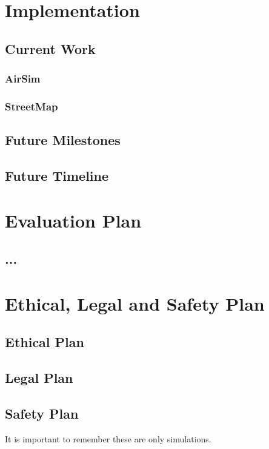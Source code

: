 \documentclass[11pt]{article}
\begin{document}
\section{Implementation}
\subsection{Current Work}
\subsubsection{AirSim}
\subsubsection{StreetMap}
\subsection{Future Milestones}
\subsection{Future Timeline}

\section{Evaluation Plan}
\subsection{...}

\section{Ethical, Legal and Safety Plan}
\subsection{Ethical Plan}
\subsection{Legal Plan}
\subsection{Safety Plan}
It is important to remember these are only simulations. 


\newpage

\nocite{*}

\end{document}
